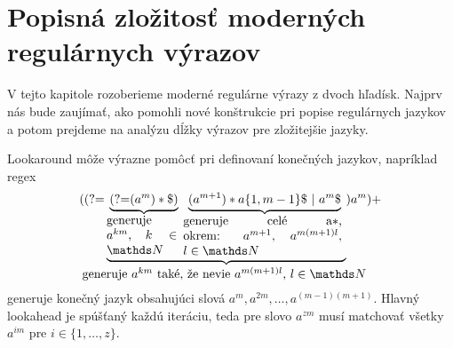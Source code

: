 \section[Popisná zložitosť]{Popisná zložitosť moderných regulárnych výrazov}
\label{vzlozitost}

V tejto kapitole rozoberieme moderné regulárne výrazy z dvoch hľadísk. Najprv nás bude zaujímať, ako pomohli nové konštrukcie pri popise regulárnych jazykov a potom prejdeme na analýzu dĺžky výrazov pre zložitejšie jazyky.

Lookaround môže výrazne pomôcť pri definovaní konečných jazykov, napríklad regex 
$$(\lookahead 
\underbrace{
	\underbrace{
		\lookahead (a^m)*\$ )
	}_{ \text{\normalsize \parbox{2cm}{generuje $a^{km}$, $k\in\N$} } }
	\underbrace{
		(a^{m+1})* a\lbrace 1,m-1\rbrace \$ ~|~ a^m \$ 
	}_{ \text{\normalsize \parbox{4.5cm}{generuje celé a$*$, okrem: $a^{m+1}$, $a^{m(m+1)l}$, $l\in\N$} } }
}_{\mathclap{ \text{\normalsize generuje $a^{km}$ také, že nevie $a^{m(m+1)l}$, $l\in\N$ } } }
) a^m)+$$
generuje konečný jazyk obsahujúci slová $a^m,\allowbreak a^{2m},\dots,\allowbreak a^{(m-1)(m+1)}$. Hlavný lookahead je spúšťaný každú iteráciu, teda pre slovo $a^{zm}$ musí matchovať všetky $a^{im}$ pre $i\in\lbrace 1,\dots,z\rbrace$.
